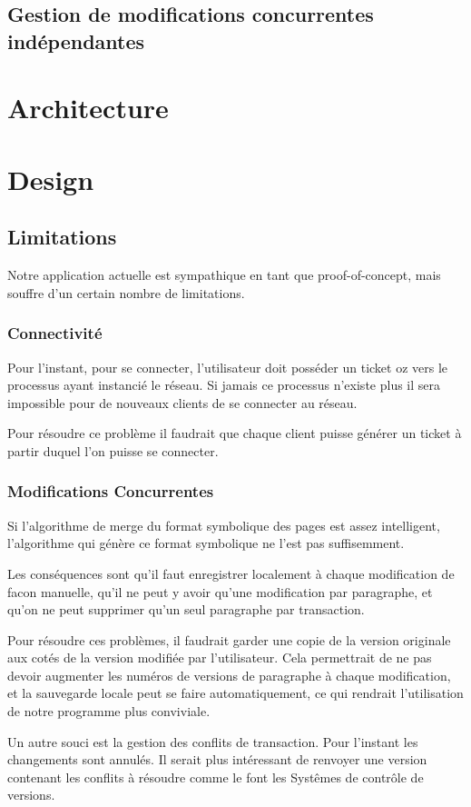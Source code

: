 \documentclass{article}
\begin{document}
	\subsection{Gestion de modifications concurrentes indépendantes}
	
	\section{Architecture}
	
	\section{Design}
	
	\subsection{Limitations}
	Notre application actuelle est sympathique en tant que proof-of-concept,
	mais souffre d'un certain nombre de limitations.
	\subsubsection{Connectivité} 
		Pour l'instant, pour se connecter, l'utilisateur doit posséder
		un ticket oz vers le processus ayant instancié le réseau.
		Si jamais ce processus n'existe plus il sera impossible pour de
		nouveaux clients de se connecter au réseau. 
		
		Pour résoudre ce problème il faudrait que chaque client puisse
		générer un ticket à partir duquel l'on puisse se connecter.
		
	 \subsubsection{Modifications Concurrentes}
	 	Si l'algorithme de merge du format symbolique des pages est
	 	assez intelligent, l'algorithme qui génère ce format symbolique
	 	ne l'est pas suffisemment. 
	 	
	 	Les conséquences sont qu'il faut enregistrer localement à 
	 	chaque modification de facon manuelle, qu'il ne peut y avoir qu'une modification par
	 	paragraphe, et qu'on ne peut supprimer qu'un seul paragraphe par
	 	transaction. 
	 	
	 	Pour résoudre ces problèmes, il faudrait garder une copie de
	 	la version originale aux cotés de la version modifiée par l'utilisateur.
	 	Cela permettrait de ne pas devoir augmenter les numéros de versions
	 	de paragraphe à chaque modification, et la sauvegarde locale peut
	 	se faire automatiquement, ce qui rendrait l'utilisation de notre
	 	programme plus conviviale. 
	 	
	 	Un autre souci est la gestion des conflits de transaction.
	 	Pour l'instant les changements sont annulés. Il serait plus
	 	intéressant de renvoyer une version contenant les conflits à résoudre
	 	comme le font les Systêmes de contrôle de versions.
\end{document}

